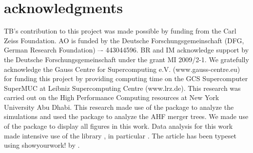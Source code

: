 \documentclass[useAMS,usenatbib]{mnras}
\begin{document}
\section*{acknowledgments}
TB's contribution to this project was made possible by funding from the Carl Zeiss Foundation. AO is funded by the Deutsche Forschungsgemeinschaft (DFG, German Research Foundation) –- 443044596. BR and IM acknowledge support by the Deutsche Forschungsgemeinschaft under the grant MI 2009/2-1. We gratefully acknowledge the Gauss Centre for Supercomputing e.V. (www.gauss-centre.eu) for funding this project by providing computing time on the GCS Supercomputer SuperMUC at Leibniz Supercomputing Centre (www.lrz.de). This research was carried out on the High Performance Computing resources at New York University Abu Dhabi.
This research made use of the {} \citet{pynbody} package to analyze the simulations and used the {} package \citep{ytree} to analyze the AHF merger trees. We made use of the {} package {} \citep{matplotlib} to display all figures in this work. Data analysis for this work made intensive use of the {} library {} \citep{scipy}, in particular {} \citep{numpy,ipython,jupyter}. The article has been typeset using showyourwork! by \citet{Luger2021}.




\appendix


\end{document}
